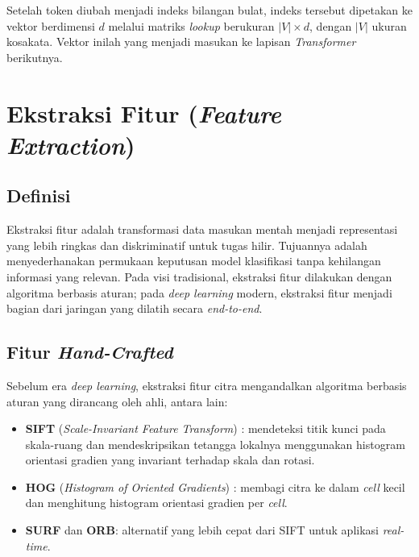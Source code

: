 Setelah token diubah menjadi indeks bilangan bulat, indeks tersebut dipetakan ke vektor berdimensi $d$ melalui matriks \textit{lookup} berukuran $|V| \times d$, dengan $|V|$ ukuran kosakata. Vektor inilah yang menjadi masukan ke lapisan \textit{Transformer} berikutnya.

\section{Ekstraksi Fitur (\textit{Feature Extraction})}
\label{sec:featureextract}

\subsection{Definisi}

Ekstraksi fitur adalah transformasi data masukan mentah menjadi representasi yang lebih ringkas dan diskriminatif untuk tugas hilir. Tujuannya adalah menyederhanakan permukaan keputusan model klasifikasi tanpa kehilangan informasi yang relevan. Pada visi tradisional, ekstraksi fitur dilakukan dengan algoritma berbasis aturan; pada \textit{deep learning} modern, ekstraksi fitur menjadi bagian dari jaringan yang dilatih secara \textit{end-to-end}.

\subsection{Fitur \textit{Hand-Crafted}}

Sebelum era \textit{deep learning}, ekstraksi fitur citra mengandalkan algoritma berbasis aturan yang dirancang oleh ahli, antara lain:

\begin{itemize}
    \item \textbf{SIFT} (\textit{Scale-Invariant Feature Transform}) \citep{lowesift2004}: mendeteksi titik kunci pada skala-ruang dan mendeskripsikan tetangga lokalnya menggunakan histogram orientasi gradien yang invariant terhadap skala dan rotasi.
    \item \textbf{HOG} (\textit{Histogram of Oriented Gradients}) \citep{dalalHOG2005}: membagi citra ke dalam \textit{cell} kecil dan menghitung histogram orientasi gradien per \textit{cell}.
    \item \textbf{SURF} dan \textbf{ORB}: alternatif yang lebih cepat dari SIFT untuk aplikasi \textit{real-time}.
\end{itemize}


